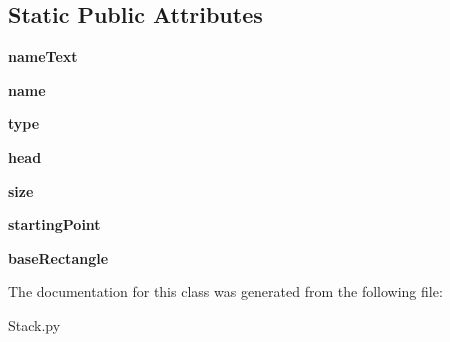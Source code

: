 \subsection*{Static Public Attributes}
\begin{DoxyCompactItemize}
\item 
{\bfseries name\+Text}\hypertarget{class_stack_1_1_stack_a6da1cd9f8ad12a4158b548580bc8cb06}{}\label{class_stack_1_1_stack_a6da1cd9f8ad12a4158b548580bc8cb06}

\item 
{\bfseries name}\hypertarget{class_stack_1_1_stack_a816d228643737425943f5b3dcff47752}{}\label{class_stack_1_1_stack_a816d228643737425943f5b3dcff47752}

\item 
{\bfseries type}\hypertarget{class_stack_1_1_stack_a04ed642405fc7683813607a2383ccd12}{}\label{class_stack_1_1_stack_a04ed642405fc7683813607a2383ccd12}

\item 
{\bfseries head}\hypertarget{class_stack_1_1_stack_a8726f351e5a08290fa4481dfdd06dbd5}{}\label{class_stack_1_1_stack_a8726f351e5a08290fa4481dfdd06dbd5}

\item 
{\bfseries size}\hypertarget{class_stack_1_1_stack_a88efefb17bc788be77ef8259f157b011}{}\label{class_stack_1_1_stack_a88efefb17bc788be77ef8259f157b011}

\item 
{\bfseries starting\+Point}\hypertarget{class_stack_1_1_stack_aff1a82eee850725bb5585d7a07b1f0ec}{}\label{class_stack_1_1_stack_aff1a82eee850725bb5585d7a07b1f0ec}

\item 
{\bfseries base\+Rectangle}\hypertarget{class_stack_1_1_stack_ad6677753e14b1bbd2a8d464ed9d5cbac}{}\label{class_stack_1_1_stack_ad6677753e14b1bbd2a8d464ed9d5cbac}

\end{DoxyCompactItemize}


The documentation for this class was generated from the following file\+:\begin{DoxyCompactItemize}
\item 
Stack.\+py\end{DoxyCompactItemize}
